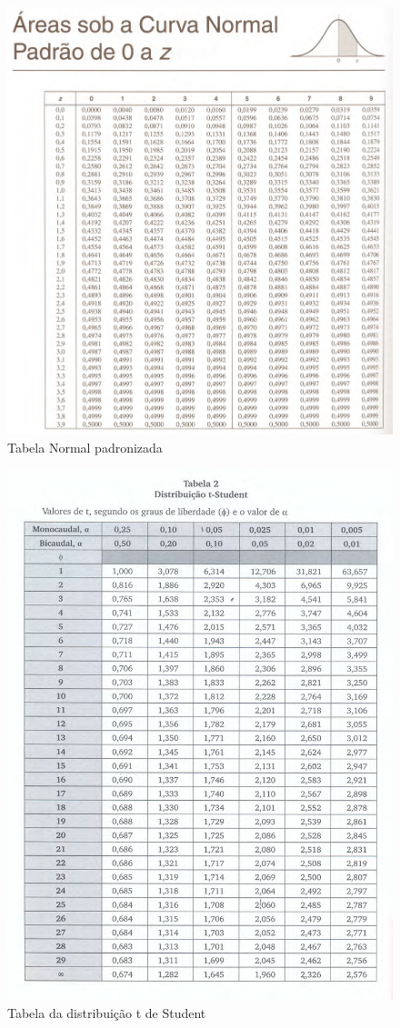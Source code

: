 \documentclass[
]{book}
\begin{document}
\begin{figure}

{\centering \includegraphics[width=0.8\linewidth]{images11/normal_reduzida_old} 

}

\caption{Tabela Normal padronizada}\label{fig:unnamed-chunk-140}
\end{figure}

\hfill\break

\begin{figure}

{\centering \includegraphics[width=0.8\linewidth]{images11/tabela_t} 

}

\caption{Tabela da distribuição t de Student}\label{fig:unnamed-chunk-141}
\end{figure}
\end{document}
